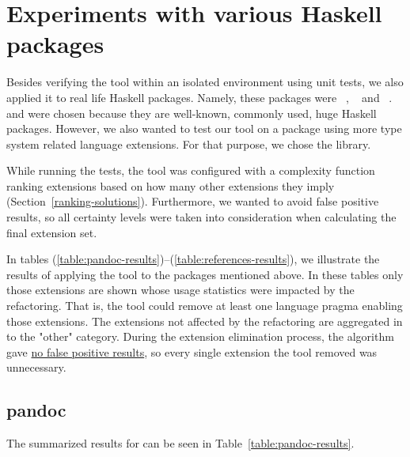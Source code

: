 \documentclass[main.tex]{subfiles}
\begin{document}
	
	\section{Experiments with various Haskell packages}
	
	Besides verifying the tool within an isolated environment using unit tests, we also applied it to real life Haskell packages. Namely, these packages were ~\cite{pandoc}, ~\cite{http-client} and ~\cite{references-bib}.  and  were chosen because they are well-known, commonly used, huge Haskell packages. However, we also wanted to test our tool on a package using more type system related language extensions. For that purpose, we chose the  library.
	
	While running the tests, the tool was configured with a complexity function ranking extensions based on how many other extensions they imply (Section~\ref{ranking-solutions}). Furthermore, we wanted to avoid false positive results, so all certainty levels were taken into consideration when calculating the final extension set.
	
	In tables (\ref{table:pandoc-results})--(\ref{table:references-results}), we illustrate the results of applying the tool to the packages mentioned above. In these tables only those extensions are shown whose usage statistics were impacted by the refactoring. That is, the tool could remove at least one language pragma enabling those extensions. The extensions not affected by the refactoring are aggregated in to the "other" category. During the extension elimination process, the algorithm gave \underline{no false positive results}, so every single extension the tool removed was unnecessary.
	
	\subsection{pandoc}
	
	The summarized results for  can be seen in Table~\ref{table:pandoc-results}.
				
\end{document}

